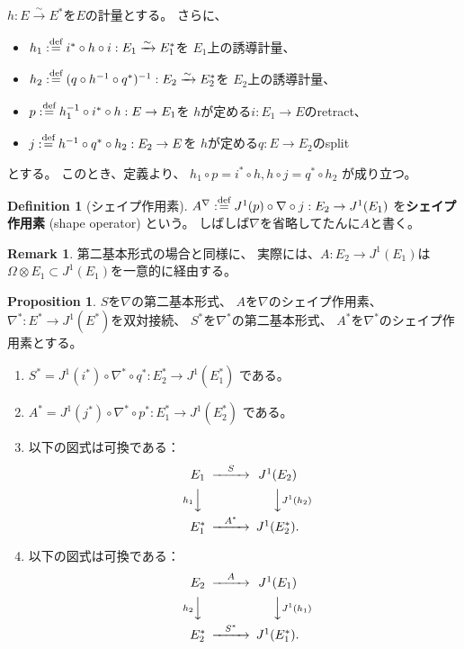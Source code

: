 \documentclass[uplatex]{jsarticle}
\theoremstyle{definition}
\newtheorem{prop}[prop]{Proposition}
\newtheorem{defi}[defi]{Definition}
\newtheorem{rem}[rem]{Remark}
\newcommand{\dfn}{:\overset{\mbox{{\scriptsize def}}}{=}}
\begin{document}
\(h:E\xrightarrow{\sim} E^*\)を\(E\)の計量とする。
さらに、
\begin{itemize}
  \item
  \(h_1\dfn i^* \circ h \circ i : E_1 \xrightarrow{\sim} E_1^*\)を
  \(E_1\)上の誘導計量、
  \item
  \(h_2 \dfn (q\circ h^{-1}\circ q^*)^{-1}: E_2 \xrightarrow{\sim} E_2^*\)を
  \(E_2\)上の誘導計量、
  \item
  \(p\dfn h_1^{-1}\circ i^*\circ h : E\to E_1\)を
  \(h\)が定める\(i:E_1 \to E\)のretract、
  \item
  \(j\dfn h^{-1}\circ q^*\circ h_2 : E_2 \to E\)を
  \(h\)が定める\(q:E\to E_2\)のsplit
\end{itemize}
とする。
このとき、定義より、
\(h_1\circ p = i^*\circ h, h\circ j = q^*\circ h_2\)
が成り立つ。


\begin{defi}[シェイプ作用素]
  \(A^{\nabla}\dfn J^1(p) \circ \nabla \circ j : E_2 \to J^1(E_1)\)
  を\textbf{シェイプ作用素} (shape operator) という。
  しばしば\(\nabla\)を省略してたんに\(A\)と書く。
\end{defi}


\begin{rem}
  第二基本形式の場合と同様に、
  実際には、\(A:E_2\to J^1(E_1)\)は
  \(\Omega\otimes E_1\subset J^1(E_1)\)を一意的に経由する。
\end{rem}


\begin{prop}\label{prop: second and shape}
  \(S\)を\(\nabla\)の第二基本形式、
  \(A\)を\(\nabla\)のシェイプ作用素、
  \(\nabla^*:E^*\to J^1(E^*)\)を双対接続、
  \(S^*\)を\(\nabla^*\)の第二基本形式、
  \(A^*\)を\(\nabla^*\)のシェイプ作用素とする。
  \begin{enumerate}
    \item \label{enumi: 1 prop: second and shape}
    \(S^* = J^1(i^*) \circ \nabla^* \circ q^* : E_2^* \to J^1(E_1^*)\)
    である。
    \item \label{enumi: 2 prop: second and shape}
    \(A^* = J^1(j^*) \circ \nabla^* \circ p^* : E_1^* \to J^1(E_2^*)\)
    である。
    \item \label{enumi: 3 prop: second and shape}
    以下の図式は可換である：
    \[
    \begin{CD}
      E_1 @>{S}>> J^1(E_2) \\
      @V{h_1}VV @VV{J^1(h_2)}V \\
      E_1^* @>{A^*}>> J^1(E_2^*).
    \end{CD}
    \]
    \item \label{enumi: 4 prop: second and shape}
    以下の図式は可換である：
    \[
    \begin{CD}
      E_2 @>{A}>> J^1(E_1) \\
      @V{h_2}VV @VV{J^1(h_1)}V \\
      E_2^* @>{S^*}>> J^1(E_1^*).
    \end{CD}
    \]
  \end{enumerate}
\end{prop}
\end{document}
